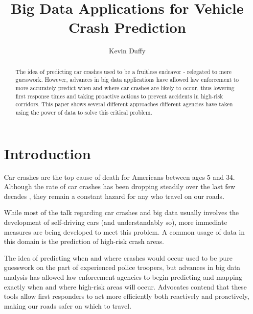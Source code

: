 \documentclass[sigconf]{acmart}
\begin{document}
\title{Big Data Applications for Vehicle Crash Prediction}


\author{Kevin Duffy}

\renewcommand{\shortauthors}{K. Duffy}


\begin{abstract}
The idea of predicting car crashes used to be a fruitless endeavor - relegated to mere guesswork. However, advances in big data applications have allowed law enforcement to more accurately predict when and where car crashes are likely to occur, thus lowering first response times and taking proactive actions to prevent accidents in high-risk corridors. This paper shows several different approaches different agencies have taken using the power of data to solve this critical problem. 
\end{abstract}



\maketitle



\section{Introduction}

Car crashes are the top cause of death for Americans between ages 5 and 34.\cite{gcn} Although the rate of car crashes has been dropping steadily over the last few decades \cite{iihs}, they remain a constant hazard for any who travel on our roads.

While most of the talk regarding car crashes and big data usually involves the development of self-driving cars (and understandably so), more immediate measures are being developed to meet this problem. A common usage of data in this domain is the prediction of high-risk crash areas.

The idea of predicting when and where crashes would occur used to be pure guesswork on the part of experienced police troopers\cite{pew}, but advances in big data analysis has allowed law enforcement agencies to begin predicting and mapping exactly when and where high-risk areas will occur. Advocates contend that these tools allow first responders to act more efficiently both reactively and proactively, making our roads safer on which to travel. 
\end{document}
